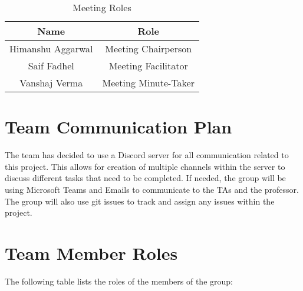 \documentclass[12pt,fleqn]{article}
\begin{document}
\begin{table}[h!]
    \centering
    \begin{tabular}{|c|c|}
    \hline
    \multicolumn{1}{|c|}{Name}              & \multicolumn{1}{c|}{Role}                \\ \hline
    \multicolumn{1}{|c|}{Himanshu Aggarwal} & \multicolumn{1}{c|}{Meeting Chairperson} \\ \hline
    Saif Fadhel                             & Meeting Facilitator                      \\ \hline
    Vanshaj Verma                           & Meeting Minute-Taker                     \\ \hline
    \end{tabular}
    \caption{Meeting Roles}
\end{table}

\section{Team Communication Plan}
\noindent The team has decided to use a Discord server for all communication related to this project. This allows for creation of multiple channels within the server to discuss different tasks that need to be completed. If needed, the group will be using Microsoft Teams and Emails to communicate to the TAs and the professor. The group will also use git issues to track and assign any issues within the project. 
\newpage 
\section{Team Member Roles}
\noindent The following table lists the roles of the members of the group:
\end{document}
